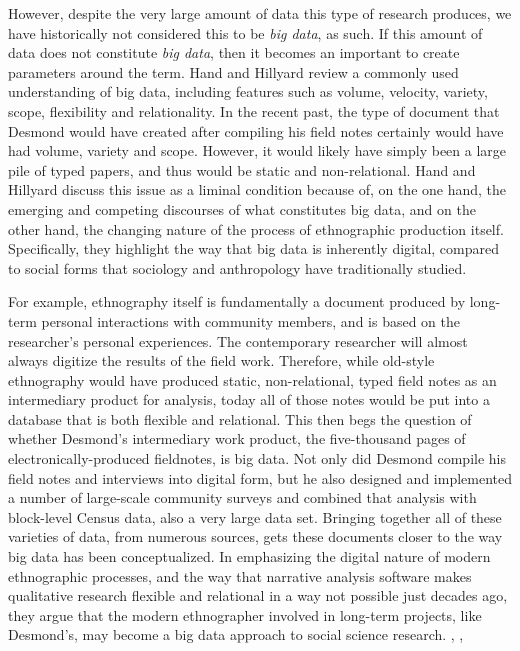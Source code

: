 \documentclass[sigconf]{acmart}
\begin{document}
However, despite the very large amount of data this type of research produces, we have historically not considered this to be {\em big data}, as such.  If this amount of data does not constitute {\em big data}, then it becomes an important to create parameters around the term. Hand and Hillyard review a commonly used understanding of big data, including features such as volume, velocity, variety, scope, flexibility and relationality. \cite {hand14} In the recent past, the type of document that Desmond would have created after compiling his field notes certainly would have had volume, variety and scope.  However, it would likely have simply been a large pile of typed papers, and thus would be static and non-relational.  Hand and Hillyard discuss this issue as a liminal condition because of, on the one hand, the emerging and competing discourses of what constitutes big data, and on the other hand, the changing nature of the process of ethnographic production itself.  Specifically, they highlight the way that big data is inherently digital, compared to social forms that sociology and anthropology have traditionally studied.  

For example, ethnography itself is fundamentally a document produced by long-term personal interactions with community members, and is based on the researcher's personal experiences.  The contemporary researcher will almost always digitize the results of the field work.  Therefore, while old-style ethnography would have produced static, non-relational, typed field notes as an intermediary product for analysis, today all of those notes would be put into a database that is both flexible and relational.  This then begs the question of whether Desmond's intermediary work product, the five-thousand pages of electronically-produced fieldnotes, is big data.  Not only did Desmond compile his field notes and interviews into digital form, but he also designed and implemented a number of large-scale community surveys and combined that analysis with block-level Census data, also a very large data set. \cite{desmond16} Bringing together all of these varieties of data, from numerous sources, gets these documents closer to the way big data has been conceptualized.  In emphasizing the digital nature of modern ethnographic processes, and the way that narrative analysis software makes qualitative research flexible and relational in a way not possible just decades ago, they argue that the modern ethnographer involved in long-term projects, like Desmond's, may become a big data approach to social science research. \cite{hand14}, \cite{japec15}, \cite{lazer17}
\end{document}
